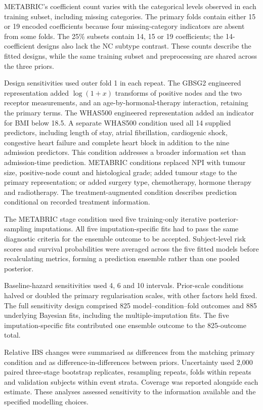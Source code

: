 

METABRIC's coefficient count varies with the categorical levels observed in each training subset, including missing categories. The primary folds contain either 15 or 19 encoded coefficients because four missing-category indicators are absent from some folds. The 25\% subsets contain 14, 15 or 19 coefficients; the 14-coefficient designs also lack the NC subtype contrast. These counts describe the fitted designs, while the same training subset and preprocessing are shared across the three priors.

Design sensitivities used outer fold 1 in each repeat. The GBSG2 engineered representation added $\log(1+x)$ transforms of positive nodes and the two receptor measurements, and an age-by-hormonal-therapy interaction, retaining the primary terms. The WHAS500 engineered representation added an indicator for BMI below 18.5. A separate WHAS500 condition used all 14 supplied predictors, including length of stay, atrial fibrillation, cardiogenic shock, congestive heart failure and complete heart block in addition to the nine admission predictors. This condition addresses a broader information set than admission-time prediction. METABRIC conditions replaced NPI with tumour size, positive-node count and histological grade; added tumour stage to the primary representation; or added surgery type, chemotherapy, hormone therapy and radiotherapy. The treatment-augmented condition describes prediction conditional on recorded treatment information.

The METABRIC stage condition used five training-only iterative posterior-sampling imputations. All five imputation-specific fits had to pass the same diagnostic criteria for the ensemble outcome to be accepted. Subject-level risk scores and survival probabilities were averaged across the five fitted models before recalculating metrics, forming a prediction ensemble rather than one pooled posterior.

Baseline-hazard sensitivities used 4, 6 and 10 intervals. Prior-scale conditions halved or doubled the primary regularisation scales, with other factors held fixed. The full sensitivity design comprised 825 model--condition--fold outcomes and 885 underlying Bayesian fits, including the multiple-imputation fits. The five imputation-specific fits contributed one ensemble outcome to the 825-outcome total.

Relative IBS changes were summarised as differences from the matching primary condition and as difference-in-differences between priors. Uncertainty used 2,000 paired three-stage bootstrap replicates, resampling repeats, folds within repeats and validation subjects within event strata. Coverage was reported alongside each estimate. These analyses assessed sensitivity to the information available and the specified modelling choices.

